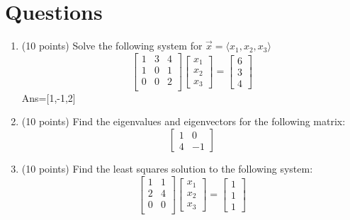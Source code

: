 \documentclass[12pt, a4paper]{article}
\theoremstyle{break}
\begin{document}
\section{Questions}
\begin{enumerate}
\item (10  points) Solve the following system for $\vec{x}=\langle x_1,x_2,x_3 \rangle$
\begin{equation}
\begin{bmatrix}
1 & 3 &4  \\
1 & 0 & 1 \\
0 & 0 & 2 \\
\end{bmatrix}
\begin{bmatrix}
x_1\\
x_2 \\
x_3 
\end{bmatrix}=
\begin{bmatrix}
6 \\
3 \\
4
\end{bmatrix} \nonumber
\end{equation} 
Ans=[1,-1,2]
\newpage
\item (10 points)  Find the eigenvalues and eigenvectors for the following matrix:
\begin{equation}
\begin{bmatrix}
1 & 0 \\
4 & -1
\end{bmatrix}
\nonumber
\end{equation}
\newpage

\item (10 points) Find the least squares solution to the following system:
\begin{equation}
\begin{bmatrix}
1 & 1 \\ 
2 & 4 \\
0 & 0 \\
\end{bmatrix}
\begin{bmatrix}
x_1 \\
x_2 \\
x_3 
\end{bmatrix}
=
\begin{bmatrix}
1 \\
1 \\
1 
\end{bmatrix} \nonumber
\end{equation}
\newpage


\end{enumerate}
\end{document}
